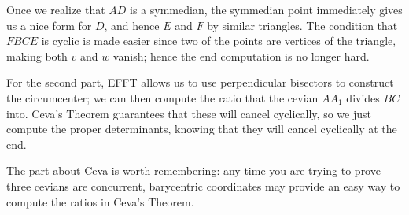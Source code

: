 \seccm
Once we realize that $AD$ is a symmedian, the symmedian point immediately gives us a nice form for $D$, and hence $E$ and $F$ by similar triangles.  The condition that $FBCE$ is cyclic is made easier since two of the points are vertices of the triangle, making both $v$ and $w$ vanish; hence the end computation is no longer hard.

For the second part, EFFT allows us to use perpendicular bisectors to construct the circumcenter; we can then compute the ratio that the cevian $AA_1$ divides $BC$ into.  Ceva's Theorem guarantees that these will cancel cyclically, so we just compute the proper determinants, knowing that they will cancel cyclically at the end.

The part about Ceva is worth remembering: any time you are trying to prove three cevians are concurrent, barycentric coordinates may provide an easy way to compute the ratios in Ceva's Theorem.
